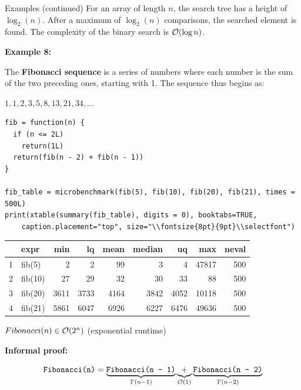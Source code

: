 \documentclass[11pt,compress,t,notes=noshow, xcolor=table]{beamer}
\begin{document}
\begin{vbframe}{Examples (continued)}
For an array of length $n$, the search tree has a height of $\log_2(n)$. After a maximum of $\log_2(n)$ comparisons, the searched element is found. The complexity of the binary search is $\mathcal{O}(\log n)$.

\framebreak

\textbf{Example 8:}

\footnotesize
The \textbf{Fibonacci sequence} is a series of numbers where each number is the sum of the two preceding ones, starting with 1. The sequence thus begins as:

$1, 1, 2, 3, 5, 8, 13, 21, 34, ...$

\begin{scriptsize}
\begin{verbatim}
fib = function(n) {
  if (n <= 2L)
    return(1L)
  return(fib(n - 2) + fib(n - 1))
}

fib_table = microbenchmark(fib(5), fib(10), fib(20), fib(21), times = 500L)
print(xtable(summary(fib_table), digits = 0), booktabs=TRUE, 
    caption.placement="top", size="\\fontsize{8pt}{9pt}\\selectfont")
\end{verbatim}
\begin{table}[ht]
  \centering
  \begingroup\fontsize{8pt}{9pt}\selectfont
  \begin{tabular}{rlrrrrrrr}
    \toprule
   & expr & min & lq & mean & median & uq & max & neval \\ 
    \midrule
  1 & fib(5) & 2 & 2 & 99 & 3 & 4 & 47817 & 500 \\ 
    2 & fib(10) & 27 & 29 & 32 & 30 & 33 & 88 & 500 \\ 
    3 & fib(20) & 3611 & 3733 & 4164 & 3842 & 4052 & 10118 & 500 \\ 
    4 & fib(21) & 5861 & 6047 & 6926 & 6227 & 6476 & 49636 & 500 \\ 
     \bottomrule
  \end{tabular}
  \endgroup
  \end{table}
\end{scriptsize}

\framebreak

$Fibonacci(n) \in \mathcal{O}(2^n)$ (exponential runtime) \\

\lz

\textbf{Informal proof:}

$$
\texttt{Fibonacci(n)} = \underbrace{\texttt{Fibonacci(n - 1)}}_{T(n-1)} \underbrace{+}_{\mathcal{O}(1)} \underbrace{\texttt{Fibonacci(n - 2)}}_{T(n-2)}
$$


\end{vbframe}
\end{document}
